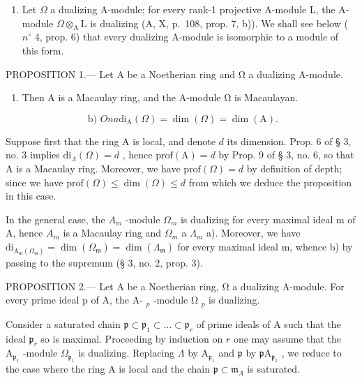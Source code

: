 \begin{enumerate}
\def\labelenumi{\arabic{enumi})}
\setcounter{enumi}{1}
\tightlist
\item
  Let \(\Omega\) a dualizing A-module; for every rank-1 projective A-module L, the A-module \(\Omega\otimes_{\mathrm{A}}\mathrm{L}\) is dualizing (A, X, p.~108, prop. 7, b)). We shall see below ( \(n^{\circ}\) 4, prop. 6) that every dualizing A-module is isomorphic to a module of this form.
\end{enumerate}

PROPOSITION 1.--- Let A be a Noetherian ring and Ω a dualizing A-module.

\begin{enumerate}
\def\labelenumi{\alph{enumi})}
\tightlist
\item
  Then A is a Macaulay ring, and the A-module Ω is Macaulayan.
\end{enumerate}

\[
\text { b) } O n a \mathrm{di} _ {\mathrm{A}} (\Omega) = \dim (\Omega) = \dim (\mathrm{A}).
\]

Suppose first that the ring A is local, and denote \(d\) its dimension. Prop. 6 of § 3, no. 3 implies \(\mathrm{di}_{\Lambda}(\Omega) = d\) , hence \(\mathrm{prof}(\mathrm{A}) = d\) by Prop. 9 of § 3, no. 6, so that A is a Macaulay ring. Moreover, we have \(\mathrm{prof}(\Omega) = d\) by definition of depth; since we have \(\mathrm{prof}(\Omega) \leqslant \dim(\Omega) \leqslant d\) from which we deduce the proposition in this case.

In the general case, the \(A_{m}\) -module \(\Omega_{m}\) is dualizing for every maximal ideal m of A, hence \(A_{m}\) is a Macaulay ring and \(\Omega_{m}\) a \(\Lambda_{m}\) a). Moreover, we have \(\mathrm{di}_{\mathrm{A}_{\mathfrak{m}}(\Omega_{\mathfrak{m}})} = \dim(\Omega_{\mathfrak{m}}) = \dim(\Lambda_{\mathfrak{m}})\) for every maximal ideal m, whence b) by passing to the supremum (§ 3, no. 2, prop. 3).

PROPOSITION 2.--- Let A be a Noetherian ring, Ω a dualizing A-module. For every prime ideal p of A, the A- \(_{p}\) -module Ω \(_{p}\) is dualizing.

Consider a saturated chain \(\mathfrak{p} \subset \mathfrak{p}_1 \subset \ldots \subset \mathfrak{p}_r\) of prime ideals of A such that the ideal \(\mathfrak{p}_r\) so is maximal. Proceeding by induction on \(r\) one may assume that the \(\mathrm{A}_{\mathfrak{p}_1}\) -module \(\Omega_{\mathfrak{p}_1}\) is dualizing. Replacing \(\Lambda\) by \(\mathrm{A}_{\mathfrak{p}_1}\) and \(\mathfrak{p}\) by \(\mathfrak{p}\mathrm{A}_{\mathfrak{p}_1}\) , we reduce to the case where the ring A is local and the chain \(\mathfrak{p} \subset \mathfrak{m}_{\Lambda}\) is saturated.

